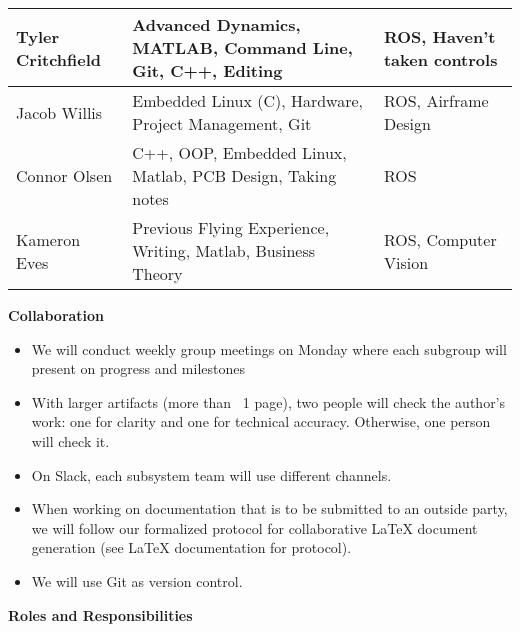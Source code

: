 \begin{table}[H]
\begin{tabular}{|p{3.5cm}|p{5.35cm}|p{5.35cm}|}
Tyler Critchfield                                 & Advanced Dynamics, MATLAB, Command Line, Git, C++, Editing                                 & ROS, Haven’t taken controls                                                                 \\ \hline
Jacob Willis                                      & Embedded Linux (C), Hardware, Project Management, Git                                      & ROS, Airframe Design                                                                        \\ \hline
Connor Olsen                                      & C++, OOP, Embedded Linux, Matlab, PCB Design, Taking notes                                 & ROS                                                                                         \\ \hline
Kameron Eves                                      & Previous Flying Experience, Writing, Matlab, Business Theory                               & ROS, Computer Vision                                                                        \\ \hline
\end{tabular}
\end{table}

\textbf{Collaboration}

\begin{itemize}
\item We will conduct weekly group meetings on Monday where each subgroup will present on progress and milestones
\item With larger artifacts (more than ~1 page), two people will check the author’s work: one for clarity and one for technical accuracy. Otherwise, one person will check it.
\item On Slack, each subsystem team will use different channels.
\item When working on documentation that is to be submitted to an outside party, we will follow our formalized protocol for collaborative LaTeX document generation (see LaTeX documentation for protocol).
\item We will use Git as version control.
\end{itemize}

\textbf{Roles and Responsibilities}

